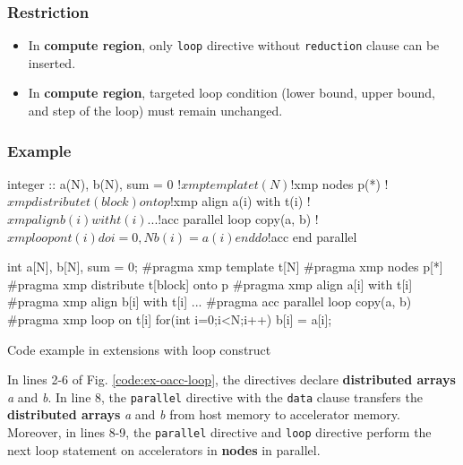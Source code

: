 \subsubsection*{Restriction}
\begin{itemize}
\item In {\OACC} {\bf compute region},
only {\XMP} {\tt loop} directive without {\tt reduction} clause can be inserted.
\item In {\OACC} {\bf compute region},
targeted loop condition (lower bound, upper bound, and step of the loop)
must remain unchanged.
\end{itemize}

\subsubsection*{Example}
\begin{myfigure}
\begin{minipage}{0.45\hsize}
\begin{center}
\begin{XACCFexampleL}
integer :: a(N), b(N), sum = 0
!$xmp template t(N)
!$xmp nodes p(*)
!$xmp distribute t(block) onto p
!$xmp align a(i) with t(i)
!$xmp align b(i) with t(i)
...
!$acc parallel loop copy(a, b)
!$xmp loop on t(i)
do i=0, N
  b(i) = a(i)
end do
!$acc end parallel
\end{XACCFexampleL}
\end{center}
\end{minipage}
%
\begin{minipage}{0.53\hsize}
\begin{center}
\begin{XACCCexampleR}
int a[N], b[N], sum = 0;
#pragma xmp template t[N]
#pragma xmp nodes p[*]
#pragma xmp distribute t[block] onto p
#pragma xmp align a[i] with t[i]
#pragma xmp align b[i] with t[i]
...
#pragma acc parallel loop copy(a, b)
#pragma xmp loop on t[i]
for(int i=0;i<N;i++){
  b[i] = a[i];
}

\end{XACCCexampleR}
\end{center}
\end{minipage}
\caption{Code example in {\XMP} extensions with {\OACC} loop construct}\label{code:ex-oacc-loop}
\end{myfigure}

In lines 2-6 of Fig. \ref{code:ex-oacc-loop},
the directives declare {\bf distributed arrays} {\it a} and {\it b}.
In line 8,
the {\tt parallel} directive with the {\tt data} clause transfers the {\bf distributed arrays} {\it a} and {\it b} from host memory to accelerator memory.
Moreover,
in lines 8-9,
the {\tt parallel} directive and {\XMP} {\tt loop} directive perform the next loop statement on accelerators in {\bf nodes} in parallel.

